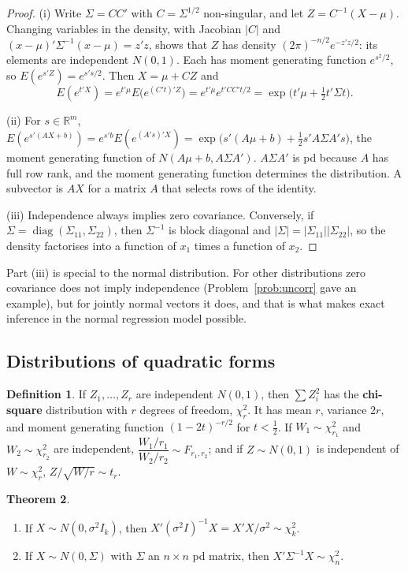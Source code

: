 \documentclass[11pt,a4paper]{article}
\numberwithin{equation}{section}
\theoremstyle{definition}
\newtheorem{thm}{Theorem}[subsection]
\newtheorem{defn}[thm]{Definition}
\begin{document}
\begin{proof}
(i) Write $\Sigma = CC'$ with $C = \Sigma^{1/2}$ non-singular, and let $Z = C^{-1}(X - \mu)$. Changing variables in the density, with Jacobian $|C|$ and
$(x - \mu)'\Sigma^{-1}(x - \mu) = z'z$, shows that $Z$ has density $(2\pi)^{-n/2}e^{-z'z/2}$: its elements are independent $N(0, 1)$. Each has moment
generating function $e^{s^2/2}$, so $E(e^{s'Z}) = e^{s's/2}$. Then $X = \mu + CZ$ and
\[
E(e^{t'X}) = e^{t'\mu}E\bigl(e^{(C't)'Z}\bigr) = e^{t'\mu}e^{t'CC't/2} = \exp\bigl(t'\mu + \tfrac12t'\Sigma t\bigr) .
\]

(ii) For $s \in \mathbb R^m$, $E(e^{s'(AX + b)}) = e^{s'b}E(e^{(A's)'X}) = \exp\bigl(s'(A\mu + b) + \frac12s'A\Sigma A's\bigr)$, the moment generating function of
$N(A\mu + b, A\Sigma A')$. $A\Sigma A'$ is pd because $A$ has full row rank, and the moment generating function determines the distribution. A
subvector is $AX$ for a matrix $A$ that selects rows of the identity.

(iii) Independence always implies zero covariance. Conversely, if $\Sigma = \operatorname{diag}(\Sigma_{11}, \Sigma_{22})$, then $\Sigma^{-1}$ is block diagonal and
$|\Sigma| = |\Sigma_{11}||\Sigma_{22}|$, so the density factorises into a function of $x_1$ times a function of $x_2$.
\end{proof}

Part (iii) is special to the normal distribution. For other distributions zero covariance does not imply independence (Problem~\ref{prob:uncorr} gave an
example), but for jointly normal vectors it does, and that is what makes exact inference in the normal regression
model possible.

\subsection{Distributions of quadratic forms}
\label{ssec:qf}

\begin{defn}
If $Z_1, \dots, Z_r$ are independent $N(0, 1)$, then $\sum Z_i^2$ has the \textbf{chi-square} distribution with $r$ degrees of freedom, $\chi^2_r$. It has
mean $r$, variance $2r$, and moment generating function $(1 - 2t)^{-r/2}$ for $t < \frac12$. If $W_1 \sim \chi^2_{r_1}$ and $W_2 \sim \chi^2_{r_2}$ are
independent, $\dfrac{W_1/r_1}{W_2/r_2} \sim F_{r_1, r_2}$; and if $Z \sim N(0, 1)$ is independent of $W \sim \chi^2_r$, $Z/\sqrt{W/r} \sim t_r$.
\end{defn}

\begin{thm}
\label{thm:qf1}
\begin{enumerate}[label=(\roman*)]
\item If $X \sim N(0, \sigma^2I_k)$, then $X'(\sigma^2I)^{-1}X = X'X/\sigma^2 \sim \chi^2_k$.
\item If $X \sim N(0, \Sigma)$ with $\Sigma$ an $n \times n$ pd matrix, then $X'\Sigma^{-1}X \sim \chi^2_n$.
\end{enumerate}
\end{thm}
\end{document}
